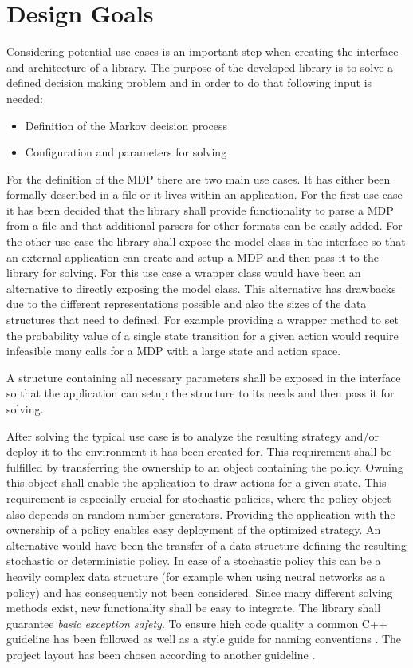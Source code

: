 \chapter {Design Goals}
\label{goals}

Considering potential use cases is an important step when creating the interface and architecture of a library. The purpose of the developed library is to solve a defined decision making problem and in order to do that following input is needed:

\begin{itemize}
	\item Definition of the Markov decision process
	\item Configuration and parameters for solving
\end{itemize}

For the definition of the MDP there are two main use cases. It has either been formally described in a file or it lives within an application. For the first use case it has been decided that the library shall provide functionality to parse a MDP from a file and that additional parsers for other formats can be easily added. For the other use case the library shall expose the model class in the interface so that an external application can create and setup a MDP and then pass it to the library for solving. For this use case a wrapper class would have been an alternative to directly exposing the model class. This alternative has drawbacks due to the different representations possible and also the sizes of the data structures that need to defined. For example providing a wrapper method to set the probability value of a single state transition for a given action would require infeasible many calls for a MDP with a large state and action space. 

A structure containing all necessary parameters shall be exposed in the interface so that the application can setup the structure to its needs and then pass it for solving. 

After solving the typical use case is to analyze the resulting strategy and/or deploy it to the environment it has been created for. This requirement shall be fulfilled by transferring the ownership to an object containing the policy. Owning this object shall enable the application to draw actions for a given state. This requirement is especially crucial for stochastic policies, where the policy object also depends on random number generators. Providing the application with the ownership of a policy enables easy deployment of the optimized strategy. An alternative would have been the transfer of a data structure defining the resulting stochastic or deterministic policy. In case of a stochastic policy this can be a heavily complex data structure (for example when using neural networks as a policy) and has consequently not been considered. 
Since many different solving methods exist, new functionality shall be easy to integrate.
The library shall guarantee \emph{basic exception safety}. 
To ensure high code quality a common C++ guideline has been followed \autocite{guideline} as well as a style guide for naming conventions \autocite{style}. The project layout has been chosen according to another guideline \autocite{layout}.
